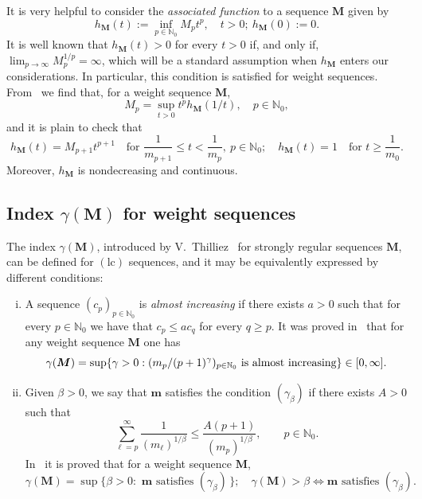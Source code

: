 \documentclass[11pt,a4paper]{article}
\theoremstyle{plain}
\theoremstyle{definition}
\numberwithin{equation}{section}
\newcommand{\N}{\mathbb{N}}
\newcommand{\om}{\omega}
\newcommand{\be}{\beta}
\newcommand{\m}{{\boldsymbol{m}}}
\newcommand{\M}{{\boldsymbol{M}}}
\def\ga{\gamma}
\newcommand{\lc}{\operatorname{(lc)}}
\begin{document}
It is very helpful to consider the \emph{associated function} to a sequence $\M$ given by
\begin{equation*}%
	h_\M(t):=\inf_{p\in\N_0}M_p t^p, \quad t>0;\ h_\M(0):=0.
\end{equation*}
It is well known that $h_{\M}(t)>0$ for every $t>0$ if, and only if, $\lim_{p\to\infty}M_p^{1/p}=\infty$, which will be a standard assumption when $h_{\M}$ enters our considerations. In particular, this condition is satisfied for weight sequences. From~\cite[Prop.~3.2]{Komatsu} we find that, for a weight sequence $\M$,
\begin{equation}\label{eq.MpfromomegaM}
	M_p=%
\sup_{t>0}t^p h_{\M}(1/t),\quad p\in\N_0,
\end{equation}
and it is plain to check that
\begin{equation}\label{eq.expression_h_M}
h_\M(t)=M_{p+1}t^{p+1} \quad\textrm{for }\frac{1}{m_{p+1}}\le t <\frac{1}{m_p},\ p\in\N_0;\quad h_\M(t)=1\quad\textrm{for }t\ge\frac{1}{m_0}.
\end{equation}
Moreover, $h_\M$ is nondecreasing and continuous.


\subsection{Index $\ga(\M)$ for weight sequences}\label{subsectIndexGammaM}

The index $\gamma(\M)$, introduced by V.~Thilliez~\cite[Sect.\ 1.3]{Thilliez03} for strongly regular sequences $\M$, can be defined for $\lc$ sequences, and it may be equivalently expressed by different conditions:
\begin{enumerate}[(i)]
\item A sequence $(c_p)_{p\in\N_0}$ is \emph{almost increasing} if there exists $a>0$ such that for every $p\in\N_0$ we have that $c_p\leq a c_q $ for every $ q\geq p$.
It was proved in~\cite{JimenezSanzSRSPO,JimenezSanzSchindlIndex} that for any weight sequence $\M$ one has
\begin{equation}\label{equa.indice.gammaM.casicrec}
\gamma(\M)=\sup\{\gamma>0:(m_{p}/(p+1)^\gamma)_{p\in\N_0}\hbox{ is almost increasing} \}\in[0,\infty].
\end{equation}
\item Given $\be>0$, we say that $\m$ satisfies the condition $(\gamma_{\be})$  if there exists $A>0$ such that
\begin{equation*}%
\sum^\infty_{\ell=p} \frac{1}{(m_\ell)^{1/\be}}\leq \frac{A (p+1) }{(m_p)^{1/\be}},  \qquad p\in\N_0.\tag{$\gamma_\be$}
\end{equation*}
In~\cite{PhDJimenez,JimenezSanzSchindlIndex} it is proved that for a weight sequence $\M$,
\begin{equation}\label{equa.indice.gammaM.gamma_r}
\gamma(\M)=\sup\{\be>0\colon \,\, \m \,\, \text{satisfies } (\gamma_{\be})\,\};\quad \gamma(\M)>\be\iff\m\text{ satisfies }(\gamma_\be).
\end{equation}
\end{enumerate}
\end{document}
